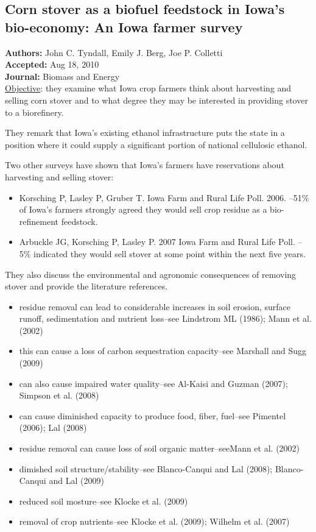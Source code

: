 \documentclass{article}\usepackage[]{graphicx}\usepackage[]{color}
\begin{document}
\subsection{Corn stover as a biofuel feedstock in Iowa's bio-economy: An Iowa farmer survey}
\textbf{Authors:} John C. Tyndall, Emily J. Berg, Joe P. Colletti \\
\textbf{Accepted:} Aug 18, 2010 \\
\textbf{Journal:} Biomass and Energy \\

\underline{Objective}:  they examine what Iowa crop farmers think about harvesting and selling corn stover and to what degree they may be interested in providing stover to a biorefinery.

They remark that Iowa's existing ethanol infrastructure puts the state in a position where it could supply a significant portion of national cellulosic ethanol.

Two other surveys have shown that Iowa's farmers have reservations about harvesting and selling stover:

\begin{itemize}
\item Korsching P, Lasley P, Gruber T.  Iowa Farm and Rural Life Poll.  2006. --51\% of Iowa's farmers strongly agreed they would sell crop residue as a bio-refinement feedstock.
\item Arbuckle JG, Korsching P, Lasley P.  2007 Iowa Farm and Rural Life Poll. --5\% indicated they would sell stover at some point within the next five years.
\end{itemize}

They also discuss the environmental and agronomic consequences of removing stover and provide the literature references.

\begin{itemize}
\item residue removal can lead to considerable increases in soil erosion, surface runoff, sedimentation and nutrient loss--see Lindstrom ML (1986); Mann et al. (2002)
\item this can cause a loss of carbon sequestration capacity--see Marshall and Sugg (2009)
\item can also cause impaired water quality--see Al-Kaisi and Guzman (2007); Simpson et al. (2008)
\item can cause diminished capacity to produce food, fiber, fuel--see Pimentel (2006); Lal (2008)
\item residue removal can cause loss of soil organic matter--seeMann et al. (2002)
\item dimished soil structure/stability--see Blanco-Canqui and Lal (2008); Blanco-Canqui and Lal (2009)
\item reduced soil mosture--see Klocke et al. (2009)
\item removal of crop nutrients--see Klocke et al. (2009); Wilhelm et al. (2007)
\end{itemize}
\end{document}
